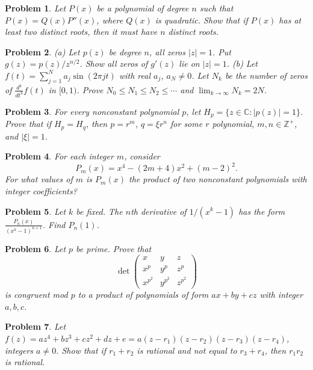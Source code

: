\documentclass[12pt]{article}
\newtheorem{problem}{Problem}
\begin{document}
\begin{problem}
Let $P(x)$ be a polynomial of degree $n$ such that $P(x)=Q(x)P''(x)$, where $Q(x)$ is quadratic. Show that if $P(x)$ has at least two distinct roots, then it must have $n$ distinct roots.
\end{problem}

\begin{problem}
(a) Let $p(z)$ be degree $n$, all zeros $|z|=1$. Put $g(z)=p(z)/z^{n/2}$. Show all zeros of $g'(z)$ lie on $|z|=1$.  
(b) Let $f(t)=\sum_{j=1}^N a_j \sin(2\pi jt)$ with real $a_j$, $a_N\neq0$. Let $N_k$ be the number of zeros of $\tfrac{d^k}{dt^k}f(t)$ in $[0,1)$. Prove $N_0\leq N_1\leq N_2\leq\cdots$ and $\lim_{k\to\infty}N_k=2N$.
\end{problem}

\begin{problem}
For every nonconstant polynomial $p$, let $H_p=\{z\in\mathbb{C}:|p(z)|=1\}$. Prove that if $H_p=H_q$, then $p=r^m$, $q=\xi r^n$ for some $r$ polynomial, $m,n\in\mathbb{Z}^+$, and $|\xi|=1$.
\end{problem}

\begin{problem}
For each integer $m$, consider
\[
P_m(x)=x^4-(2m+4)x^2+(m-2)^2.
\]
For what values of $m$ is $P_m(x)$ the product of two nonconstant polynomials with integer coefficients?
\end{problem}

\begin{problem}
Let $k$ be fixed. The $n$th derivative of $1/(x^k-1)$ has the form $\frac{P_n(x)}{(x^k-1)^{n+1}}$. Find $P_n(1)$.
\end{problem}

\begin{problem}
Let $p$ be prime. Prove that
\[
\det\begin{pmatrix}
x & y & z \\ x^p & y^p & z^p \\ x^{p^2} & y^{p^2} & z^{p^2}
\end{pmatrix}
\]
is congruent mod $p$ to a product of polynomials of form $ax+by+cz$ with integer $a,b,c$.
\end{problem}

\begin{problem}
Let $f(z)=az^4+bz^3+cz^2+dz+e=a(z-r_1)(z-r_2)(z-r_3)(z-r_4)$, integers $a\neq0$. Show that if $r_1+r_2$ is rational and not equal to $r_3+r_4$, then $r_1r_2$ is rational.
\end{problem}
\end{document}
